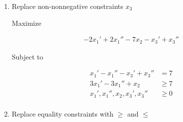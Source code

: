 \documentclass[12pt]{article}
\begin{document}
\begin{enumerate}[1.]
\begin{enumerate}[1.]
\begin{mdframed}
        \end{mdframed}

        \item Replace non-nonnegative constraints $x_3$

        \begin{mdframed}

        Maximize

        \begin{align*}
            -2x_1' + 2x_1'' - 7x_2 - x_3' + x_3''
        \end{align*}

        Subject to

        \begin{align*}
            x_1' - x_1'' - x_3' + x_3''  &= 7\\
            3x_1' - 3x_1'' + x_2 &\geq 7\\
            x_1', x_1'', x_2, x_3', x_3'' &\geq 0\\
        \end{align*}

        \end{mdframed}

        \item Replace equality constraints with $\geq$ and $\leq$

    \end{enumerate}

    \bigskip


\end{enumerate}
\end{document}
